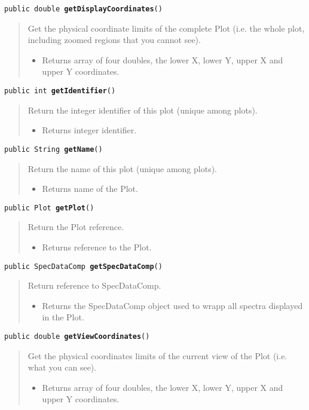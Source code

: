 \documentclass[twoside,11pt,nolof]{starlink}
\providecommand{\method}[1]{\texttt{#1}}
\newenvironment{desc}{\begin{quote}}{\end{quote}}
\begin{document}
\method{public double \textbf{getDisplayCoordinates}()\label{l164}\label{l165}}
\begin{desc}Get the physical coordinate limits of the complete Plot
 (i.e. the whole plot, including zoomed regions that you cannot
 see).
\begin{itemize}
\item{Returns array of four doubles, the lower X, lower Y, upper X
         and upper Y coordinates. }
\end{itemize}
\end{desc}

\method{public int \textbf{getIdentifier}()\label{l166}\label{l167}}
\begin{desc}Return the integer identifier of this plot (unique among plots).
\begin{itemize}
\item{Returns integer identifier. }
\end{itemize}
\end{desc}

\method{public String \textbf{getName}()\label{l168}\label{l169}}
\begin{desc}Return the name of this plot (unique among plots).
\begin{itemize}
\item{Returns name of the Plot. }
\end{itemize}
\end{desc}

\method{public Plot \textbf{getPlot}()\label{l170}\label{l171}}
\begin{desc}Return the Plot reference.
\begin{itemize}
\item{Returns reference to the Plot. }
\end{itemize}
\end{desc}

\method{public SpecDataComp \textbf{getSpecDataComp}()\label{l172}\label{l173}}
\begin{desc}Return reference to SpecDataComp.
\begin{itemize}
\item{Returns the SpecDataComp object used to wrapp all spectra
         displayed in the Plot. }
\end{itemize}
\end{desc}

\method{public double \textbf{getViewCoordinates}()\label{l174}\label{l175}}
\begin{desc}Get the physical coordinates limits of the current view of the
 Plot (i.e. what you can see).
\begin{itemize}
\item{Returns array of four doubles, the lower X, lower Y, upper X
         and upper Y coordinates. }
\end{itemize}
\end{desc}
\end{document}
